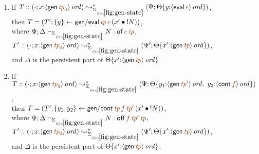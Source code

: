 \begin{lemma}~
\begin{enumerate}
\item If 
   $T :: (\cdot; x{:}\istrue{\susp{{\sf gen}\,\lf{{\it tp}_0}}})
         \leadsto^*_{\siggenstate}
         (\Psi; \tackon{\Theta}
            {y{:}\istrue{\susp{{\sf eval}\,\lf{e}}}})$,
\\ then 
   $T = \left(T'; \trstep{y}{{\sf gen/eval}\,\lf{{\it tp}}\,\lf{e}\,
                                  (\tfuser{x'}{\tbangr{N}})}\right)$,
\\ where
   $\Psi; \Delta \vdash_{\siggenstate} N : {{\sf of}\,\lf{e}\,\lf{{\it tp}}}$,
\\ $T' :: (\cdot; x{:}\istrue{\susp{{\sf gen}\,\lf{{\it tp}_0}}})
       \leadsto^*_{\siggenstate}
       (\Psi'; \tackon{\Theta}
          {x'{:}\istrue{\susp{{\sf gen}\,\lf{{\it tp}}}}})$, 
\\ and $\Delta$ is the persistent part of 
   $\tackon{\Theta}
          {x'{:}\istrue{\susp{{\sf gen}\,\lf{{\it tp}}}}}$.
   
\medskip
\item If 
   $T :: (\cdot; x{:}\istrue{\susp{{\sf gen}\,\lf{{\it tp}_0}}})
         \leadsto^*_{\siggenstate}
         (\Psi; \tackon{\Theta}
            {y_1{:}\istrue{\susp{{\sf gen}\,\lf{{\it tp}'}}}, ~
             y_2{:}\istrue{\susp{{\sf cont}\,\lf{f}}}})$,
\\ then 
   $T = \left(T'; \trstep{y_1,y_2}
              {{\sf gen/cont}\,\lf{{\it tp}}\,\lf{f}\,\lf{{\it tp}'}\,
                (\tfuser{x'}{\tbangr{N}})}\right)$,
\\ where 
   $\Psi; \Delta \vdash_{\siggenstate} N : 
       {{{\sf off}\,\lf{f}\,\lf{{\it tp}'}\,\lf{{\it tp}}}}$,
\\ $T' :: (\cdot; x{:}\istrue{\susp{{\sf gen}\,\lf{{\it tp}_0}}})
       \leadsto^*_{\siggenstate}
       (\Psi'; \tackon{\Theta}
          {x'{:}\istrue{\susp{{\sf gen}\,\lf{{\it tp}}}}})$,
\\ and $\Delta$ is the persistent part of 
   $\tackon{\Theta}
          {x'{:}\istrue{\susp{{\sf gen}\,\lf{{\it tp}}}}}$.



\end{enumerate}
\end{lemma}
